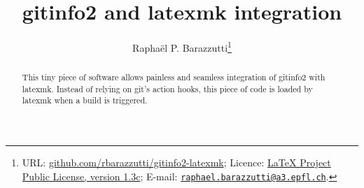 \documentclass[A4]{ltxdoc}
\begin{document}
\thispagestyle{plain}
\title{gitinfo2 and latexmk integration}
\renewcommand{\gitMark}{
Release:\gitReln{}: \gitAbbrevHash{} (\gitAuthorDate)}
\author{%
  Raphaël P. Barazzutti\thanks{%
    URL: \href{https://github.com/rbarazzutti/gitinfo2-latexmk}{github.com/rbarazzutti/gitinfo2-latexmk};
    Licence: \href{http://latex-project.org/lppl/lppl-1-3c.txt}{LaTeX Project Public License, version 1.3c};
    E-mail: \href{mailto:raphael.barazzutti@a3.epfl.ch}{\tt raphael.barazzutti@a3.epfl.ch}.}}

\maketitle
\thispagestyle{plain}
\begin{abstract}
    This tiny piece of software allows painless and seamless integration of \textsf{gitinfo2} with \textsf{latexmk}. Instead of relying on \textsf{git}'s action hooks, this piece of code is loaded
    by \textsf{latexmk} when a build is triggered.
\end{abstract}

\end{document}
